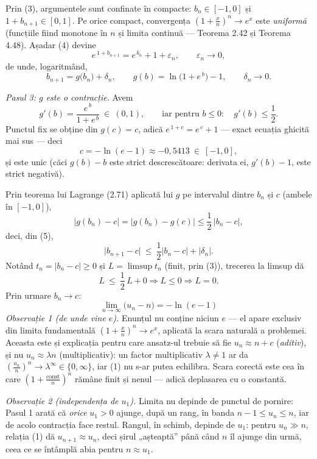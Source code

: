 Prin (3), argumentele sunt confinate în compacte: $b_{n}\in[-1,0]$ și $1+b_{n+1}\in[0,1]$. Pe orice compact, convergența $\left(1+\frac xn\right)^{n}\to e^{x}$ este \emph{uniformă} (funcțiile fiind monotone în $n$ și limita continuă --- Teorema 2.42 și Teorema 4.48). Așadar (4) devine
\[ e^{\,1+b_{n+1}}=e^{\,b_{n}}+1+\varepsilon_{n},\qquad \varepsilon_{n}\to0 , \]
de unde, logaritmând,
\[ b_{n+1}=g\bigl(b_{n}\bigr)+\delta_{n},\qquad g(b)=\ln\bigl(1+e^{\,b}\bigr)-1,\qquad \delta_{n}\to0 . \tag{5} \]

\emph{Pasul 3: $g$ este o contracție.} Avem
\[ g'(b)=\frac{e^{\,b}}{1+e^{\,b}}\ \in\ (0,1),\qquad\text{iar pentru }b\le0:\quad g'(b)\le\frac{1}{2} . \]
Punctul fix se obține din $g(c)=c$, adică $e^{\,1+c}=e^{\,c}+1$ --- exact ecuația ghicită mai sus --- deci
\[ c=-\ln(e-1)\approx-0{,}5413\ \in\ [-1,0] , \]
și este unic (căci $g(b)-b$ este strict descrescătoare: derivata ei, $g'(b)-1$, este strict negativă).

Prin teorema lui Lagrange (2.71) aplicată lui $g$ pe intervalul dintre $b_{n}$ și $c$ (ambele în $[-1,0]$),
\[ \bigl|g(b_{n})-c\bigr|=\bigl|g(b_{n})-g(c)\bigr|\le\frac12\,\bigl|b_{n}-c\bigr| , \]
deci, din (5),
\[ \bigl|b_{n+1}-c\bigr|\ \le\ \frac12\bigl|b_{n}-c\bigr|+|\delta_{n}| . \]
Notând $t_{n}=|b_{n}-c|\ge0$ și $L=\limsup t_{n}$ (finit, prin (3)), trecerea la limsup dă
\[ L\ \le\ \frac12\,L+0 \Longrightarrow L\le0 \Longrightarrow L=0 . \]
Prin urmare $b_{n}\to c$:
\[ \boxed{\ \lim_{n\to\infty}\bigl(u_{n}-n\bigr)=-\ln(e-1)\ } \]
\emph{Observație 1 (de unde vine $e$).} Enunțul nu conține niciun $e$ --- el apare exclusiv din limita fundamentală $\left(1+\frac xn\right)^{n}\to e^{x}$, aplicată la scara naturală a problemei. Aceasta este și explicația pentru care ansatz-ul trebuie să fie $u_{n}\approx n+c$ (\emph{aditiv}), și nu $u_{n}\approx\lambda n$ (multiplicativ): un factor multiplicativ $\lambda\neq1$ ar da $\left(\frac{u_{n}}{n}\right)^{n}\to\lambda^{\infty}\in\{0,\infty\}$, iar (1) nu s-ar putea echilibra. Scara corectă este cea în care $\left(1+\frac{\text{const}}{n}\right)^{n}$ rămâne finit și nenul --- adică deplasarea cu o constantă.

\emph{Observație 2 (independența de $u_{1}$).} Limita nu depinde de punctul de pornire: Pasul 1 arată că \emph{orice} $u_{1}>0$ ajunge, după un rang, în banda $n-1\le u_{n}\le n$, iar de acolo contracția face restul. Rangul, în schimb, depinde de $u_{1}$: pentru $u_{n}\gg n$, relația (1) dă $u_{n+1}\approx u_{n}$, deci șirul „așteaptă'' până când $n$ îl ajunge din urmă, ceea ce se întâmplă abia pentru $n\approx u_{1}$.

